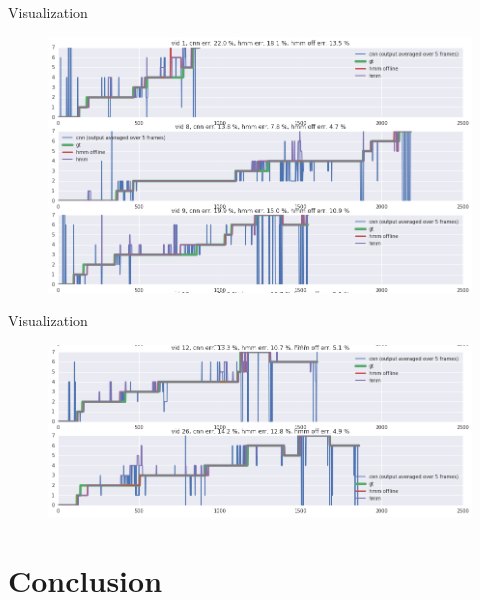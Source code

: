 \begin{frame}{Visualization}

	\begin{figure}
\begin{center}
   \includegraphics[width=1\linewidth]{images/visu1.png}
\end{center}
\label{fig:long}
\label{fig:onecol}
\end{figure}	
	
\end{frame}

\begin{frame}{Visualization}
	
	\begin{figure}
		\begin{center}
			\includegraphics[width=1\linewidth]{images/visu2.png}
		\end{center}
		\label{fig:long}
		\label{fig:onecol}
	\end{figure}	
	
\end{frame}


\section{Conclusion} \subsection{}\label{}

